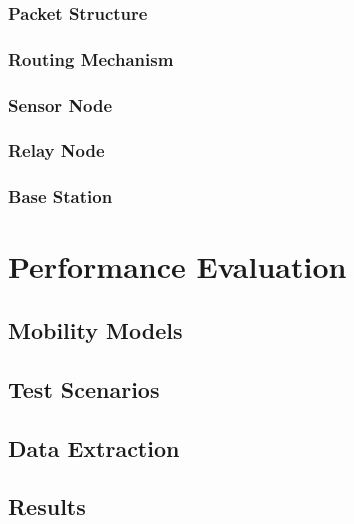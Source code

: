 \documentclass[conference]{IEEEtran}
\begin{document}
\subsubsection{Packet Structure}

\subsubsection{Routing Mechanism}

\subsubsection{Sensor Node}

\subsubsection{Relay Node}

\subsubsection{Base Station}



\section{Performance Evaluation}

\subsection{Mobility Models}

\subsection{Test Scenarios}

\subsection{Data Extraction} 

\subsection{Results}
\end{document}
